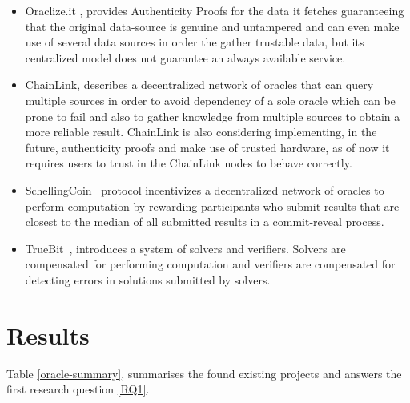 \documentclass[final,3p,12pt,twocolumn]{elsarticle}
\begin{document}
\begin{itemize}
  \item Oraclize.it \citet{Oraclize}, provides Authenticity Proofs for the data it fetches guaranteeing that the original data-source is genuine and untampered and can even make use of several data sources in order the gather trustable data, but its centralized model does not guarantee an always available service.
  \item ChainLink\citet{Ellis2017}, describes a decentralized network of oracles that can query multiple sources in order to avoid dependency of a sole oracle which can be prone to fail and also to gather knowledge from multiple sources to obtain a more reliable result. ChainLink is also considering implementing, in the future, authenticity proofs and make use of trusted hardware, as of now it requires users to trust in the ChainLink nodes to behave correctly.
  \item SchellingCoin~\citet{VitalikButerin2014} protocol incentivizes a decentralized network of oracles to perform computation by rewarding participants who submit results that are closest to the median of all submitted results in a commit-reveal process.
  \item TrueBit~\citet{Teutsch2017}, introduces a system of solvers and verifiers. Solvers are compensated for performing computation and verifiers are compensated for detecting errors in solutions submitted by solvers.
\end{itemize}

\section{Results}


Table \ref{oracle-summary}, summarises the found existing projects and answers the first research question \ref{RQ1}.
\end{document}
